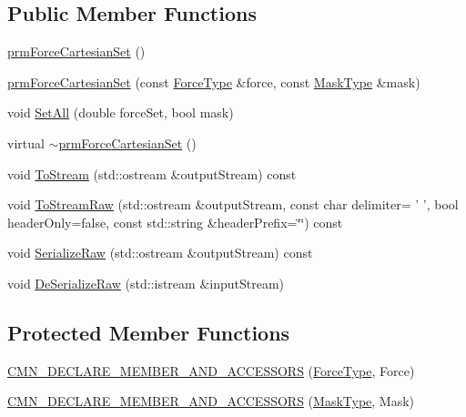 \subsection*{Public Member Functions}
\begin{DoxyCompactItemize}
\item 
\hyperlink{classprm_force_cartesian_set_a0365087de929b46d3f79bbd55491731c}{prm\-Force\-Cartesian\-Set} ()
\item 
\hyperlink{classprm_force_cartesian_set_a456fabc5cecaa75cda0934696d57831d}{prm\-Force\-Cartesian\-Set} (const \hyperlink{classprm_force_cartesian_set_aef7a9a5a3ce601f7d1f1c752ddb36c00}{Force\-Type} \&force, const \hyperlink{classprm_force_cartesian_set_abcc1516523be27cf3b572d0d1c463db9}{Mask\-Type} \&mask)
\item 
void \hyperlink{classprm_force_cartesian_set_a38537175a3cf47a82f9b74826605c0c2}{Set\-All} (double force\-Set, bool mask)
\item 
virtual \hyperlink{classprm_force_cartesian_set_ac1544bc3e945811b2406f34df9a8d084}{$\sim$prm\-Force\-Cartesian\-Set} ()
\item 
void \hyperlink{classprm_force_cartesian_set_a78ba6df453036e7cc2490be6bcc9bf7f}{To\-Stream} (std\-::ostream \&output\-Stream) const 
\item 
void \hyperlink{classprm_force_cartesian_set_a5cddf5bcd6c9663b7e435c4b9bddf1af}{To\-Stream\-Raw} (std\-::ostream \&output\-Stream, const char delimiter= ' ', bool header\-Only=false, const std\-::string \&header\-Prefix=\char`\"{}\char`\"{}) const 
\item 
void \hyperlink{classprm_force_cartesian_set_a5a62aa3833314ee1df02d8e85b32fa1e}{Serialize\-Raw} (std\-::ostream \&output\-Stream) const 
\item 
void \hyperlink{classprm_force_cartesian_set_afed6acd5be75fc38cfee9000a52b6209}{De\-Serialize\-Raw} (std\-::istream \&input\-Stream)
\end{DoxyCompactItemize}
\subsection*{Protected Member Functions}
\begin{DoxyCompactItemize}
\item 
\hyperlink{classprm_force_cartesian_set_a7b1376e3debee0dc4e290eeda1836abc}{C\-M\-N\-\_\-\-D\-E\-C\-L\-A\-R\-E\-\_\-\-M\-E\-M\-B\-E\-R\-\_\-\-A\-N\-D\-\_\-\-A\-C\-C\-E\-S\-S\-O\-R\-S} (\hyperlink{classprm_force_cartesian_set_aef7a9a5a3ce601f7d1f1c752ddb36c00}{Force\-Type}, Force)
\item 
\hyperlink{classprm_force_cartesian_set_a3cb88ba29555b4ff1839a2ddf0933809}{C\-M\-N\-\_\-\-D\-E\-C\-L\-A\-R\-E\-\_\-\-M\-E\-M\-B\-E\-R\-\_\-\-A\-N\-D\-\_\-\-A\-C\-C\-E\-S\-S\-O\-R\-S} (\hyperlink{classprm_force_cartesian_set_abcc1516523be27cf3b572d0d1c463db9}{Mask\-Type}, Mask)
\end{DoxyCompactItemize}


